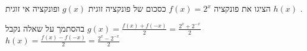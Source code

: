 הציגו את פונקציה $f(x)=2^x$
כסכום של פונקציה זוגית $g(x)$
ופונקציה אי זוגית $h(x)$
.
\begin{solbox}
בהסתמך על שאלה  נקבל
$g(x)=\frac{f(x)+f(-x)}{2}=\frac{2^x+2^{-x}}{2}$
\\
$h(x)=\frac{f(x)-f(-x)}{2}=\frac{2^x-2^{-x}}{2}$
\end{solbox}
